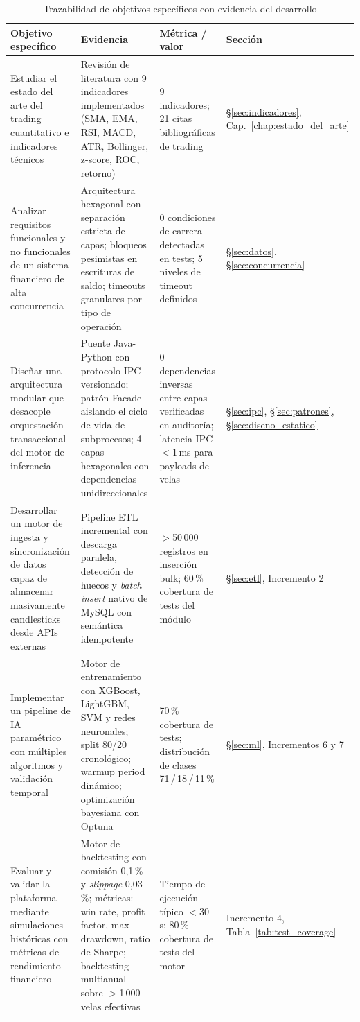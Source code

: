 \begin{table}[H]
    \centering
    \caption{Trazabilidad de objetivos específicos con evidencia del desarrollo}
    \label{tab:trazabilidad_objetivos}
    \begin{tabular}{p{4.0cm} p{4.5cm} p{3.2cm} p{1.5cm}}
    \hline
    \textbf{Objetivo específico} & \textbf{Evidencia} & \textbf{Métrica / valor} & \textbf{Sección} \\
    \hline
    Estudiar el estado del arte del trading cuantitativo e indicadores técnicos
    & Revisión de literatura con 9 indicadores implementados (SMA, EMA, RSI, MACD, ATR, Bollinger, z-score, ROC, retorno)
    & 9 indicadores; 21 citas bibliográficas de trading
    & §\ref{sec:indicadores}, Cap.~\ref{chap:estado_del_arte} \\
    \hline
    Analizar requisitos funcionales y no funcionales de un sistema financiero de alta concurrencia
    & Arquitectura hexagonal con separación estricta de capas; bloqueos pesimistas en escrituras de saldo; timeouts granulares por tipo de operación
    & 0 condiciones de carrera detectadas en tests; 5 niveles de timeout definidos
    & §\ref{sec:datos}, §\ref{sec:concurrencia} \\
    \hline
    Diseñar una arquitectura modular que desacople orquestación transaccional del motor de inferencia
    & Puente Java-Python con protocolo IPC versionado; patrón Facade aislando el ciclo de vida de subprocesos; 4 capas hexagonales con dependencias unidireccionales
    & 0 dependencias inversas entre capas verificadas en auditoría; latencia IPC $<$1\,ms para payloads de velas
    & §\ref{sec:ipc}, §\ref{sec:patrones}, §\ref{sec:diseno_estatico} \\
    \hline
    Desarrollar un motor de ingesta y sincronización de datos capaz de almacenar masivamente candlesticks desde APIs externas
    & Pipeline ETL incremental con descarga paralela, detección de huecos y \textit{batch insert} nativo de MySQL con semántica idempotente
    & $>$50\,000 registros en inserción bulk; 60\,\% cobertura de tests del módulo
    & §\ref{sec:etl}, Incremento 2 \\
    \hline
    Implementar un pipeline de IA paramétrico con múltiples algoritmos y validación temporal
    & Motor de entrenamiento con XGBoost, LightGBM, SVM y redes neuronales; split 80/20 cronológico; warmup period dinámico; optimización bayesiana con Optuna
    & 70\,\% cobertura de tests; distribución de clases 71\,/\,18\,/\,11\,\%
    & §\ref{sec:ml}, Incrementos 6 y 7 \\
    \hline
    Evaluar y validar la plataforma mediante simulaciones históricas con métricas de rendimiento financiero
    & Motor de backtesting con comisión 0,1\,\% y \textit{slippage} 0,03\,\%; métricas: win rate, profit factor, max drawdown, ratio de Sharpe; backtesting multianual sobre $>$1\,000 velas efectivas
    & Tiempo de ejecución típico $<$30\,s; 80\,\% cobertura de tests del motor
    & Incremento 4, Tabla~\ref{tab:test_coverage} \\
    \hline
    \end{tabular}
\end{table}

